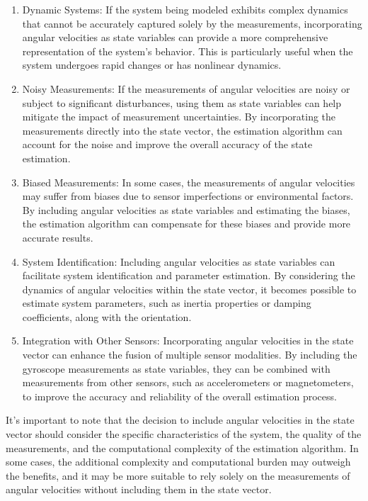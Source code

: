 \begin{enumerate}
  \item Dynamic Systems: If the system being modeled exhibits complex dynamics that cannot be accurately captured solely by the measurements, incorporating angular velocities as state variables can provide a more comprehensive representation of the system's behavior. This is particularly useful when the system undergoes rapid changes or has nonlinear dynamics.
  
  \item Noisy Measurements: If the measurements of angular velocities are noisy or subject to significant disturbances, using them as state variables can help mitigate the impact of measurement uncertainties. By incorporating the measurements directly into the state vector, the estimation algorithm can account for the noise and improve the overall accuracy of the state estimation.
  
  \item Biased Measurements: In some cases, the measurements of angular velocities may suffer from biases due to sensor imperfections or environmental factors. By including angular velocities as state variables and estimating the biases, the estimation algorithm can compensate for these biases and provide more accurate results.
  
  \item System Identification: Including angular velocities as state variables can facilitate system identification and parameter estimation. By considering the dynamics of angular velocities within the state vector, it becomes possible to estimate system parameters, such as inertia properties or damping coefficients, along with the orientation.
  
  \item Integration with Other Sensors: Incorporating angular velocities in the state vector can enhance the fusion of multiple sensor modalities. By including the gyroscope measurements as state variables, they can be combined with measurements from other sensors, such as accelerometers or magnetometers, to improve the accuracy and reliability of the overall estimation process.
\end{enumerate}

It's important to note that the decision to include angular velocities in the state vector should consider the specific characteristics of the system, the quality of the measurements, and the computational complexity of the estimation algorithm. In some cases, the additional complexity and computational burden may outweigh the benefits, and it may be more suitable to rely solely on the measurements of angular velocities without including them in the state vector.
